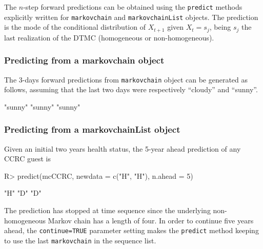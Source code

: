 \documentclass[
  nojss]{jss}
\begin{document}
The \(n\)-step forward predictions can be obtained using the \texttt{predict} methods explicitly written for \texttt{markovchain} and \texttt{markovchainList} objects. The prediction is the mode of the conditional distribution of \(X_{t+1}\) given \(X_{t}=s_{j}\), being \(s_{j}\) the last realization of the DTMC (homogeneous or non-homogeneous).

\hypertarget{predicting-from-a-markovchain-object}{%
\subsubsection{Predicting from a markovchain object}\label{predicting-from-a-markovchain-object}}

The 3-days forward predictions from \texttt{markovchain} object can be generated as follows, assuming that the last two days were respectively ``cloudy'' and ``sunny''.

\begin{CodeChunk}


\begin{CodeOutput}
[1] "sunny" "sunny" "sunny"
\end{CodeOutput}
\end{CodeChunk}

\hypertarget{predicting-from-a-markovchainlist-object}{%
\subsubsection{Predicting from a markovchainList object}\label{predicting-from-a-markovchainlist-object}}

Given an initial two years health status, the 5-year ahead prediction of any CCRC guest is

\begin{CodeChunk}

\begin{CodeInput}
R> predict(mcCCRC, newdata = c("H", "H"), n.ahead = 5)
\end{CodeInput}

\begin{CodeOutput}
[1] "H" "D" "D"
\end{CodeOutput}
\end{CodeChunk}

The prediction has stopped at time sequence since the underlying non-homogeneous Markov chain has a length of four. In order to continue five years ahead, the \texttt{continue=TRUE} parameter setting makes the \texttt{predict} method keeping to use the last \texttt{markovchain} in the sequence list.
\end{document}
